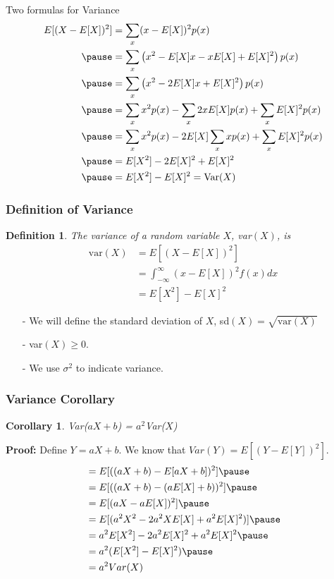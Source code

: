 \documentclass[aspectratio=169, handout]{beamer}
\newtheorem{defn}{Definition}
\newtheorem{cor}{Corollary}
\numberwithin{equation}{section}
\begin{document}
\begin{frame}{Two formulas for Variance}
\begin{align*} 
E[(X - E[X])^2] &= \sum_{x} (x  - E[X])^2p(x) \\  \pause 
& =  \sum_{x} \left(x^2  -E[X] x -x E[X] + E[X]^2\right) p(x)   \\  \pause 
& =  \sum_{x} \left(x^2  -2E[X] x  + E[X]^2\right) p(x)  \\  \pause 
& =  \sum_{x} x^2 p(x)   - \sum_{x} 2x E[X]p(x) + \sum_{x} E[X]^2 p(x)   \\  \pause 
& =  \sum_{x} x^2 p(x)   - 2E[X] \sum_{x} x p(x) + \sum_{x} E[X]^2 p(x)   \\  \pause 
& =  E[X^2] - 2E[X]^2 + E[X]^2  \\ \pause 
& =  E[X^2] - E[X]^2 =  \text{Var}(X)
\end{align*}
\end{frame}


\begin{frame}
\frametitle{Definition of Variance}

\begin{defn}
The variance of a random variable $X$, var$(X)$, is 
\begin{align*}
 \text{var}(X) &= E[(X - E[X])^2]  \\
 &=  \int_{-\infty}^{\infty} (x - E[X])^2f(x) dx \\
 &=   E[X^2] - E[X]^2 \
\end{align*}
\end{defn}

\begin{itemize}
\item[-] We will define the standard deviation of $X$, sd$(X) = \sqrt{\text{var}(X)} $
\item[-] var$(X) \geq 0$.  
\item[-] We use $\sigma^2$ to indicate variance.
\end{itemize}


\end{frame}


\begin{frame}
\frametitle{Variance Corollary} 

\begin{cor}
Var($aX  + b$)  = $a^2$Var($X$) 
\end{cor} 
\pause 

\textbf{Proof:} Define $Y = aX +b$.  We know that $Var(Y) = E[(Y - E[Y])^2]$. \pause 
\begin{align*}
& = E[ ((aX + b) - E[a X + b])^2 ]   \pause \\
& = E[ ((aX + b) - (a E[X] + b))^2 ]   \pause \\
& = E[ (aX -a E[X] )^2 ]  \pause \\
& =  E[ (a^2 X^2 - 2 a^2 X E[X] + a^2 E[X]^2)]  \pause \\
& =  a^2E[X^2] -2a^2E[X]^2 + a^2 E[X]^2   \pause \\
& =  a^2(E[X^2] - E[X]^2) \pause  \\
& =  a^2 Var(X) 
 \end{align*}
\end{frame}
\end{document}
